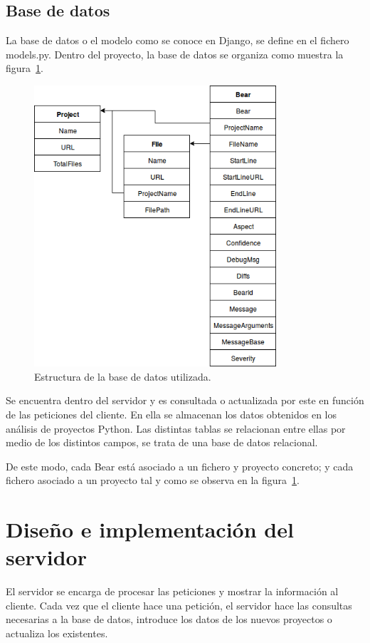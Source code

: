 \documentclass[a4paper, 12pt]{book}
\begin{document}
\subsection{Base de datos}
\label{sec:seccion11.3}
La base de datos o el modelo como se conoce en Django, se define en el fichero models.py. Dentro del proyecto, la base de datos se organiza como muestra la figura~\ref{fig:Estructura_BBDD}.
\begin{figure}[H]
  \centering
  \includegraphics[width=9cm, keepaspectratio]{img/Estructura_BBDD}
  \caption{Estructura de la base de datos utilizada.}
  \label{fig:Estructura_BBDD}
\end{figure}
Se encuentra dentro del servidor y es consultada o actualizada por este en función de las peticiones del cliente. En ella se almacenan los datos obtenidos en los análisis de proyectos Python. Las distintas tablas se relacionan entre ellas por medio de los distintos campos, se trata de una base de datos relacional.

De este modo, cada Bear está asociado a un fichero y proyecto concreto; y cada fichero asociado a un proyecto tal y como se observa en la figura~\ref{fig:Estructura_BBDD}.

\section{Diseño e implementación del servidor} 
\label{sec:seccion12}
El servidor se encarga de procesar las peticiones y mostrar la información al cliente. Cada vez que el cliente hace una petición, el servidor hace las consultas necesarias a la base de datos, introduce los datos de los nuevos proyectos o actualiza los existentes.
\end{document}
